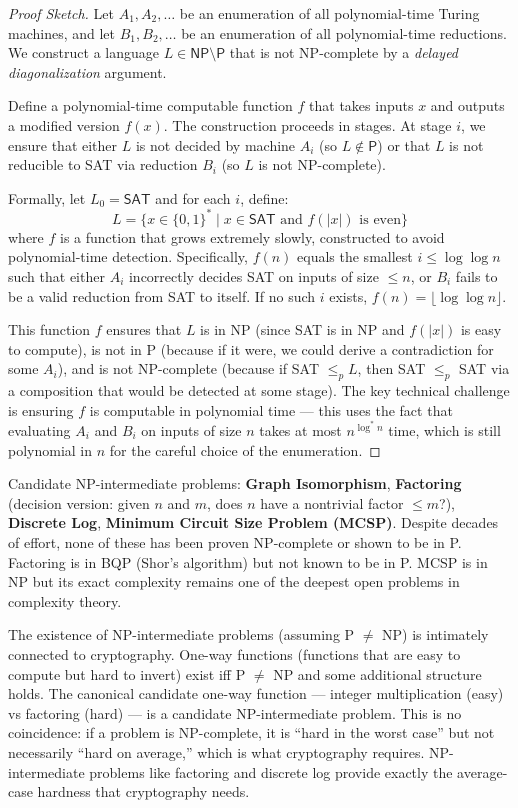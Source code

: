 \begin{proof}[Proof Sketch]
Let $A_1, A_2, \dots$ be an enumeration of all polynomial-time Turing machines, and let $B_1, B_2, \dots$ be an enumeration of all polynomial-time reductions. We construct a language $L \in \mathsf{NP} \setminus \mathsf{P}$ that is not NP-complete by a \emph{delayed diagonalization} argument.

Define a polynomial-time computable function $f$ that takes inputs $x$ and outputs a modified version $f(x)$. The construction proceeds in stages. At stage $i$, we ensure that either $L$ is not decided by machine $A_i$ (so $L \notin \mathsf{P}$) or that $L$ is not reducible to SAT via reduction $B_i$ (so $L$ is not NP-complete). 

Formally, let $L_0 = \mathsf{SAT}$ and for each $i$, define:
\[
L = \{ x \in \{0,1\}^* \mid x \in \mathsf{SAT} \text{ and } f(|x|) \text{ is even} \}
\]
where $f$ is a function that grows extremely slowly, constructed to avoid polynomial-time detection. Specifically, $f(n)$ equals the smallest $i \le \log \log n$ such that either $A_i$ incorrectly decides SAT on inputs of size $\le n$, or $B_i$ fails to be a valid reduction from SAT to itself. If no such $i$ exists, $f(n) = \lfloor \log \log n \rfloor$.

This function $f$ ensures that $L$ is in NP (since SAT is in NP and $f(|x|)$ is easy to compute), is not in P (because if it were, we could derive a contradiction for some $A_i$), and is not NP-complete (because if SAT $\le_p L$, then SAT $\le_p$ SAT via a composition that would be detected at some stage). The key technical challenge is ensuring $f$ is computable in polynomial time — this uses the fact that evaluating $A_i$ and $B_i$ on inputs of size $n$ takes at most $n^{\log^* n}$ time, which is still polynomial in $n$ for the careful choice of the enumeration.
\end{proof}

Candidate NP-intermediate problems: \textbf{Graph Isomorphism}, \textbf{Factoring} (decision version: given $n$ and $m$, does $n$ have a nontrivial factor $\le m$?), \textbf{Discrete Log}, \textbf{Minimum Circuit Size Problem (MCSP)}. Despite decades of effort, none of these has been proven NP-complete or shown to be in P. Factoring is in BQP (Shor's algorithm) but not known to be in P. MCSP is in NP but its exact complexity remains one of the deepest open problems in complexity theory.

The existence of NP-intermediate problems (assuming P $\neq$ NP) is intimately connected to cryptography. One-way functions (functions that are easy to compute but hard to invert) exist iff P $\neq$ NP and some additional structure holds. The canonical candidate one-way function — integer multiplication (easy) vs factoring (hard) — is a candidate NP-intermediate problem. This is no coincidence: if a problem is NP-complete, it is ``hard in the worst case'' but not necessarily ``hard on average,'' which is what cryptography requires. NP-intermediate problems like factoring and discrete log provide exactly the average-case hardness that cryptography needs.

